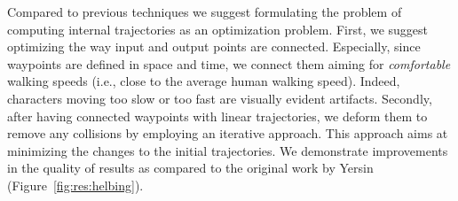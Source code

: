 Compared to previous techniques we suggest formulating the problem of computing internal trajectories as an optimization problem.
First, we suggest optimizing the way input and output points are connected.
Especially, since waypoints are defined in space and time, we connect them aiming for {\it comfortable} walking speeds (i.e., close to the average human walking speed).
Indeed, characters moving too slow or too fast are visually evident artifacts.
Secondly, after having connected waypoints with linear trajectories, we deform them to remove any collisions by employing an iterative approach.
This approach aims at minimizing the changes to the initial trajectories.
We demonstrate improvements in the quality of results as compared to the original work by Yersin \etal (Figure~\ref{fig:res:helbing}).


